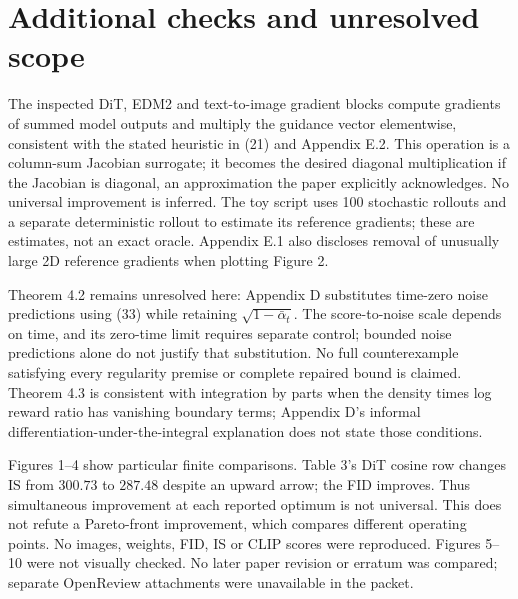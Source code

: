 \documentclass[10pt]{article}
\begin{document}
\section*{Additional checks and unresolved scope}
The inspected DiT, EDM2 and text-to-image gradient blocks compute gradients of summed model outputs and multiply the guidance vector elementwise, consistent with the stated heuristic in (21) and Appendix E.2. This operation is a column-sum Jacobian surrogate; it becomes the desired diagonal multiplication if the Jacobian is diagonal, an approximation the paper explicitly acknowledges. No universal improvement is inferred. The toy script uses 100 stochastic rollouts and a separate deterministic rollout to estimate its reference gradients; these are estimates, not an exact oracle. Appendix E.1 also discloses removal of unusually large 2D reference gradients when plotting Figure 2.\par
Theorem 4.2 remains unresolved here: Appendix D substitutes time-zero noise predictions using (33) while retaining \(\sqrt{1-\bar\alpha_t}\). The score-to-noise scale depends on time, and its zero-time limit requires separate control; bounded noise predictions alone do not justify that substitution. No full counterexample satisfying every regularity premise or complete repaired bound is claimed. Theorem 4.3 is consistent with integration by parts when the density times log reward ratio has vanishing boundary terms; Appendix D’s informal differentiation-under-the-integral explanation does not state those conditions.\par
Figures 1–4 show particular finite comparisons. Table 3’s DiT cosine row changes IS from \(300.73\) to \(287.48\) despite an upward arrow; the FID improves. Thus simultaneous improvement at each reported optimum is not universal. This does not refute a Pareto-front improvement, which compares different operating points. No images, weights, FID, IS or CLIP scores were reproduced. Figures 5–10 were not visually checked. No later paper revision or erratum was compared; separate OpenReview attachments were unavailable in the packet.\par
\end{document}
